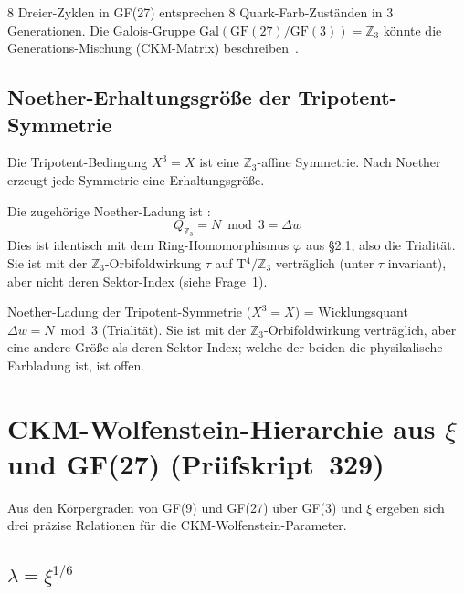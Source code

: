 \begin{keyresult}[Status~\KM]
8 Dreier-Zyklen in GF(27) entsprechen 8 Quark-Farb-Zuständen
in 3 Generationen. Die Galois-Gruppe $\mathrm{Gal}(\mathrm{GF}(27)/\mathrm{GF}(3)) = \mathbb{Z}_3$
könnte die Generations-Mischung (CKM-Matrix) beschreiben~\SM.
\end{keyresult}

\subsection{Noether-Erhaltungsgröße der Tripotent-Symmetrie}

Die Tripotent-Bedingung $X^3 = X$ ist eine $\mathbb{Z}_3$-affine Symmetrie.
Nach Noether erzeugt jede Symmetrie eine Erhaltungsgröße.

Die zugehörige Noether-Ladung ist \BM:
\begin{equation}
  Q_{\mathbb{Z}_3} = N \bmod 3 = \Delta w
\end{equation}
Dies ist identisch mit dem Ring-Homomorphismus $\varphi$ aus §2.1,
also die Trialität. Sie ist mit der $\mathbb{Z}_3$-Orbifoldwirkung $\tau$
auf T$^4/\mathbb{Z}_3$ verträglich (unter $\tau$ invariant), aber nicht
deren Sektor-Index (siehe Frage~1).

\begin{keyresult}[Status~\BM]
Noether-Ladung der Tripotent-Symmetrie ($X^3=X$) = Wicklungsquant $\Delta w = N\bmod 3$ (Trialität).
Sie ist mit der $\mathbb{Z}_3$-Orbifoldwirkung verträglich, aber eine andere Größe als
deren Sektor-Index; welche der beiden die physikalische Farbladung ist, ist offen.
\end{keyresult}

\section{CKM-Wolfenstein-Hierarchie aus $\xi$ und GF(27) (Prüfskript~329)}
\label{sec:ckm}

Aus den Körpergraden von GF(9) und GF(27) über GF(3) und $\xi$ ergeben sich drei präzise
Relationen für die CKM-Wolfenstein-Parameter.

\subsection{$\lambda = \xi^{1/6}$}

